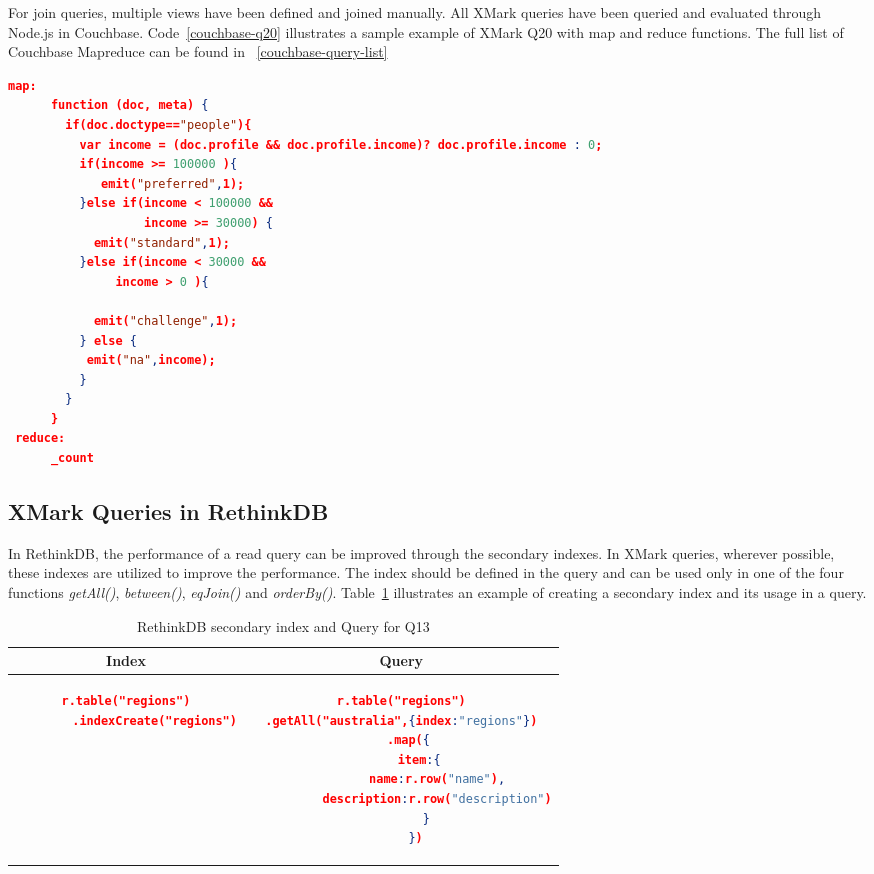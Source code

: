 
 For join queries, multiple views have been defined and joined manually. All XMark queries have been queried and evaluated through Node.js in Couchbase. 
Code~\ref{couchbase-q20} illustrates a sample example of XMark  Q20 with map and reduce functions. The full list of Couchbase Mapreduce can be found in ~\ref{couchbase-query-list}
\begin{lstlisting}[language=JSON, caption=XMark query Q20 in Couchbase Server, label=couchbase-q20,  basicstyle=\scriptsize]
	map:
	  function (doc, meta) {
	    if(doc.doctype=="people"){
	      var income = (doc.profile && doc.profile.income)? doc.profile.income : 0;
	      if(income >= 100000 ){
	    	 emit("preferred",1);
	      }else if(income < 100000 && 
	               income >= 30000) {
	        emit("standard",1);
	      }else if(income < 30000 &&
	           income > 0 ){
	       
	        emit("challenge",1);
	      } else {
	       emit("na",income);
	      }
	    }
	  }
 reduce:
	  _count
\end{lstlisting}

\subsection{XMark Queries in RethinkDB}
In RethinkDB, the performance of a read query can be improved through the secondary indexes. In XMark queries,  wherever possible, these indexes are utilized to improve the performance. The index should be defined in the query and can be used only in one of the four functions \textit{getAll()}, \textit{between()}, \textit{eqJoin()} and \textit{orderBy()}. Table~\ref{tbl:rethinkdb-index-query} illustrates an example of creating a secondary index and its usage in a query.
\begin{longtable}{c|c}
	\caption{ RethinkDB secondary index and Query for Q13}
	\label{tbl:rethinkdb-index-query}\\
    {Index} & {Query}\\
	\hline
\begin{minipage}{.3\textwidth}
\begin{lstlisting}[language=JSON,basicstyle=\scriptsize]
    r.table("regions")
        .indexCreate("regions")
\end{lstlisting}
\end{minipage} &
\begin{minipage}{.5\textwidth}
\begin{lstlisting}[language=JSON,basicstyle=\scriptsize]
r.table("regions")
.getAll("australia",{index:"regions"})
    .map({  
       item:{  
          name:r.row("name"),
          description:r.row("description")
       }
    })
\end{lstlisting}
\end{minipage}
\end{longtable}

